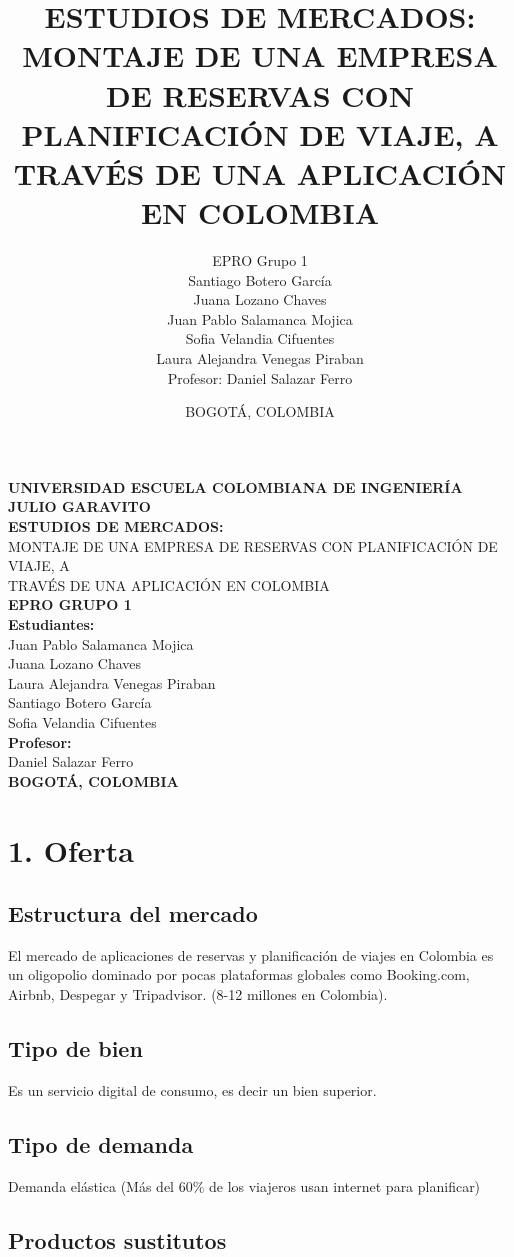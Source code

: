 \documentclass[12pt,a4paper]{article}
\title{\textbf{ESTUDIOS DE MERCADOS:}\\
MONTAJE DE UNA EMPRESA DE RESERVAS CON PLANIFICACIÓN DE VIAJE, A\\
TRAVÉS DE UNA APLICACIÓN EN COLOMBIA}
\author{EPRO Grupo 1\\
    \small Santiago Botero García\\
    \small Juana Lozano Chaves\\
    \small Juan Pablo Salamanca Mojica\\
    \small Sofia Velandia Cifuentes\\
    \small Laura Alejandra Venegas Piraban\\
    \vspace{0.5cm}
    \small Profesor: Daniel Salazar Ferro}
\date{BOGOTÁ, COLOMBIA}
\newcommand{\sectiontitle}[1]{\section{#1}}
\newcommand{\subsectiontitle}[1]{\subsection{#1}}
\begin{document}
\begin{titlepage}
    \centering
    \vspace*{2cm}
    
    {\Large\textbf{UNIVERSIDAD ESCUELA COLOMBIANA DE INGENIERÍA JULIO GARAVITO}}\\[1cm]
    
    {\Large\textbf{ESTUDIOS DE MERCADOS:}}\\[0.5cm]
    {\Large MONTAJE DE UNA EMPRESA DE RESERVAS CON PLANIFICACIÓN DE VIAJE, A}\\[0.3cm]
    {\Large TRAVÉS DE UNA APLICACIÓN EN COLOMBIA}\\[2cm]
    
    {\large\textbf{EPRO GRUPO 1}}\\[1.5cm]
    
    \textbf{Estudiantes:}\\[0.5cm]
    Juan Pablo Salamanca Mojica\\
    Juana Lozano Chaves\\
    Laura Alejandra Venegas Piraban\\
    Santiago Botero García\\
    Sofia Velandia Cifuentes\\[1.5cm]
    
    \textbf{Profesor:}\\[0.5cm]
    Daniel Salazar Ferro\\[2cm]
    
    \textbf{BOGOTÁ, COLOMBIA}
    
    \vfill
\end{titlepage}

\tableofcontents
\newpage

\sectiontitle{1. Oferta}

\subsectiontitle{Estructura del mercado}

El mercado de aplicaciones de reservas y planificación de viajes en Colombia es un oligopolio dominado por pocas plataformas globales como Booking.com, Airbnb, Despegar y Tripadvisor. (8-12 millones en Colombia).

\subsectiontitle{Tipo de bien}

Es un servicio digital de consumo, es decir un bien superior.

\subsectiontitle{Tipo de demanda}

Demanda elástica (Más del 60\% de los viajeros usan internet para planificar)

\subsectiontitle{Productos sustitutos}
\end{document}
